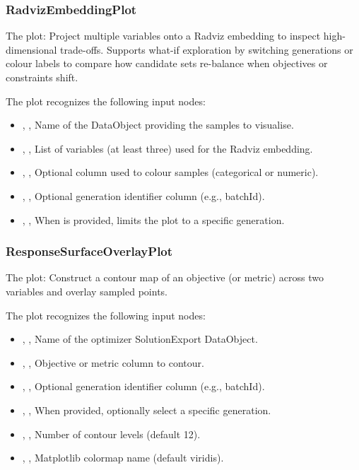 \subsubsection{RadvizEmbeddingPlot}
The   plot: Project multiple variables onto a Radviz embedding to inspect high-dimensional trade-offs. Supports what-if exploration by switching generations or colour labels to compare how candidate sets re-balance when objectives or constraints shift.

The  plot recognizes the following input nodes:
\begin{itemize}
  \item {}, , Name of the DataObject providing the samples to visualise.
  \item {}, , List of variables (at least three) used for the Radviz embedding.
  \item {}, , Optional column used to colour samples (categorical or numeric).
  \item {}, , Optional generation identifier column (e.g., batchId).
  \item {}, , When  is provided, limits the plot to a specific generation.
\end{itemize}

\subsubsection{ResponseSurfaceOverlayPlot}
The   plot: Construct a contour map of an objective (or metric) across two variables and overlay sampled points.

The  plot recognizes the following input nodes:
\begin{itemize}
  \item {}, , Name of the optimizer SolutionExport DataObject.
  \item {}, , Objective or metric column to contour.
  \item {}, , Optional generation identifier column (e.g., batchId).
  \item {}, , When  provided, optionally select a specific generation.
  \item {}, , Number of contour levels (default 12).
  \item {}, , Matplotlib colormap name (default viridis).
\end{itemize}

